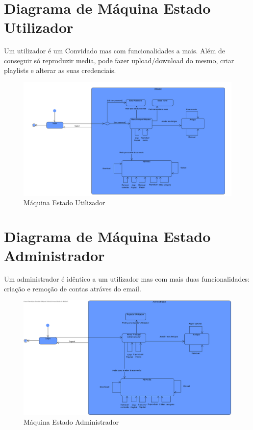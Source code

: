 \documentclass[a4paper]{report}
\begin{document}
\section{Diagrama de Máquina Estado Utilizador}

Um utilizador é um Convidado mas com funcionalidades a mais. Além
de conseguir só reproduzir media, pode fazer upload/download do mesmo, criar
playlists e alterar as suas credenciais.

\begin{figure}[H]
	\centering 
    \includegraphics[width=\textwidth]{images/maqUser.png}  
    \caption{Máquina Estado Utilizador}
\end{figure}

\section{Diagrama de Máquina Estado Administrador}

Um administrador é idêntico a um utilizador mas com mais duas funcionalidades:
criação e remoção de contas atráves do email.

\begin{figure}[H]
	\centering 
    \includegraphics[width=\textwidth]{images/maqAdmin.png}  
    \caption{Máquina Estado Administrador}
\end{figure}
\end{document}

